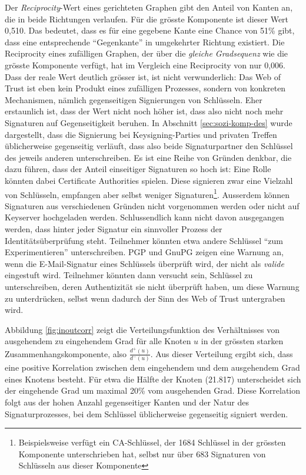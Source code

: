 Der \emph{Reciprocity}-Wert eines gerichteten Graphen gibt den Anteil
von Kanten an, die in beide Richtungen verlaufen. F\"ur die gr\"osste
Komponente ist dieser Wert 0,510. Das bedeutet, dass es f\"ur eine
gegebene Kante eine Chance von 51\% gibt, dass eine entsprechende
``Gegenkante'' in umgekehrter Richtung existiert. Die Reciprocity
eines zuf\"alligen Graphen, der \"uber die \emph{gleiche Gradsequenz}
wie die gr\"osste Komponente verf\"ugt, hat im Vergleich eine
Reciprocity von nur 0,006. Dass der reale Wert deutlich gr\"osser ist,
ist nicht verwunderlich: Das Web of Trust ist eben kein Produkt eines
zuf\"alligen Prozesses, sondern von konkreten Mechanismen, n\"amlich
gegenseitigen Signierungen von Schl\"usseln. Eher erstaunlich ist,
dass der Wert nicht noch h\"oher ist, dass also nicht noch mehr
Signaturen auf Gegenseitigkeit beruhen. In Abschnitt
\ref{sec:sozi-komp-des} wurde dargestellt, dass die Signierung bei
Keysigning-Parties und privaten Treffen \"ublicherweise gegenseitig
verl\"auft, dass also beide Signaturpartner den Schl\"ussel des
jeweils anderen unterschreiben. Es ist eine Reihe von Gr\"unden
denkbar, die dazu f\"uhren, dass der Anteil einseitiger Signaturen so
hoch ist: Eine Rolle k\"onnten dabei Certificate Authorities
spielen. Diese signieren zwar eine Vielzahl von Schl\"usseln,
empfangen aber selbst weniger Signaturen\footnote{Beispielsweise
  verf\"ugt ein CA-Schl\"ussel, der 1684 Schl\"ussel in der gr\"ossten
  Komponente unterschrieben hat, selbst nur \"uber 683 Signaturen von
  Schl\"usseln aus dieser Komponente}. Ausserdem k\"onnen Signaturen
aus verschiedenen Gr\"unden nicht vorgenommen werden oder nicht auf
Keyserver hochgeladen werden. Schlussendlich kann nicht davon
ausgegangen werden, dass hinter jeder Signatur ein sinnvoller Prozess
der Identit\"ats\"uberpr\"ufung steht. Teilnehmer k\"onnten etwa
andere Schl\"ussel ``zum Experimentieren'' unterschreiben. PGP und
GnuPG zeigen eine Warnung an, wenn die E-Mail-Signatur eines
Schl\"ussels \"uberpr\"uft wird, der nicht als \emph{valide}
eingestuft wird. Teilnehmer k\"onnten dann versucht sein, Schl\"ussel
zu unterschreiben, deren Authentizit\"at sie nicht \"uberpr\"uft
haben, um diese Warnung zu unterdr\"ucken, selbst wenn dadurch der
Sinn des Web of Trust untergraben wird.

Abbildung \ref{fig:inoutcorr} zeigt die Verteilungsfunktion des
Verh\"altnisses von ausgehendem zu eingehendem Grad f\"ur alle Knoten
$u$ in der gr\"ossten starken Zusammenhangskomponente, also
$\frac{d^+(u)}{d^-(u)}$. Aus dieser Verteilung ergibt sich, dass eine
positive Korrelation zwischen dem eingehendem und dem ausgehendem Grad
eines Knotens besteht. F\"ur etwa die H\"alfte der Knoten (21.817)
unterscheidet sich der eingehende Grad um maximal 20\% vom ausgehenden
Grad. Diese Korrelation folgt aus der hohen Anzahl gegenseitiger
Kanten und der Natur des Signaturprozesses, bei dem Schl\"ussel
\"ublicherweise gegenseitig signiert werden.

